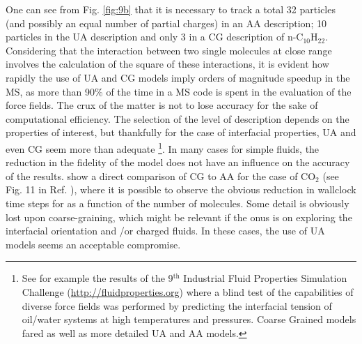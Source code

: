 \documentclass[9pt,bestpractices]{livecoms}
\begin{document}
One can see from Fig. \ref{fig:9b} that it is necessary to track a total 32 particles (and possibly
an equal number of partial charges) in an AA description; 10 particles in the
UA description and only 3 in a CG description of n-C$_{10}$H$_{22}$.
Considering that the interaction between two single molecules at close range
involves the calculation of the square of these interactions, it is evident how
rapidly the use of UA and CG models imply orders of magnitude speedup in
the MS, as more than 90\% of the time in a MS code is spent in the evaluation
of the force fields. The crux of the matter is not to lose accuracy for the
sake of computational efficiency. The selection of the level of description
depends on the properties of interest, but thankfully for the case of
interfacial properties, UA and even CG seem more than adequate
\footnote{See for example the results of the 9$^{\mathrm{th}}$
Industrial Fluid Properties Simulation Challenge
(\url{http://fluidproperties.org}) where a blind test of the capabilities of
diverse force fields was performed by predicting the interfacial tension of
oil/water systems at high temperatures and pressures. Coarse Grained models
\citet{herdes2018} fared as well as more detailed UA and AA models\citet{chen2018}.}.
In many cases for
simple fluids, the reduction in the fidelity of the model does not have an
influence on the accuracy of the results. 
\citet{avendano2011} show a direct comparison of CG to AA for the case of
CO$_{2}$ (see Fig. 11 in Ref. \citep{avendano2011}), where it is possible
to observe the obvious reduction in wallclock time steps for as a function of
the number of molecules. Some detail is obviously lost upon coarse-graining,
which might be relevant if the onus is on exploring the interfacial orientation
and /or charged fluids. In these cases, the use of UA models seems an
acceptable compromise. 
\end{document}
